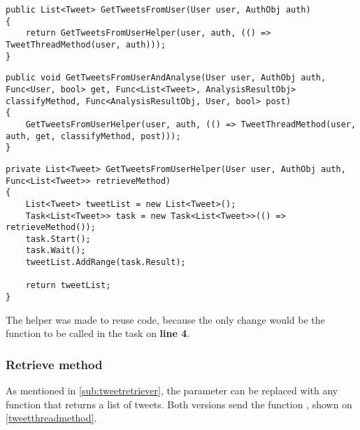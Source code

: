 \begin{minipage}[H]{\linewidth}
\begin{lstlisting}[caption = Legacy method call , label = legacyUserTweet ] 
public List<Tweet> GetTweetsFromUser(User user, AuthObj auth)
{	
    return GetTweetsFromUserHelper(user, auth, (() => TweetThreadMethod(user, auth)));
}
\end{lstlisting}
\end{minipage}

\begin{minipage}[H]{\linewidth}
\begin{lstlisting}[caption = Current method call to speed up execution , label =
NewUserTweet ] 
public void GetTweetsFromUserAndAnalyse(User user, AuthObj auth, Func<User, bool> get, Func<List<Tweet>, AnalysisResultObj> classifyMethod, Func<AnalysisResultObj, User, bool> post)
{
    GetTweetsFromUserHelper(user, auth, (() => TweetThreadMethod(user, auth, get, classifyMethod, post)));
}
\end{lstlisting}
\end{minipage}

\begin{minipage}[H]{\linewidth}
\begin{lstlisting}[caption = The GetTweetsFromUserHelper, label =
UserTweetHelper]
private List<Tweet> GetTweetsFromUserHelper(User user, AuthObj auth, Func<List<Tweet>> retrieveMethod)
{
    List<Tweet> tweetList = new List<Tweet>();
    Task<List<Tweet>> task = new Task<List<Tweet>>(() => retrieveMethod());
    task.Start();
    task.Wait();
    tweetList.AddRange(task.Result);

    return tweetList;
}
\end{lstlisting}
\end{minipage}

The helper was made to reuse code, because the only change would be the function to be
called in the task on \textbf{line 4}.\\

\subsubsection{Retrieve method}
As mentioned in \autoref{sub:tweetretriever}, the 
parameter can be replaced with any function that returns a list of tweets. Both
versions send the function , shown on
\autoref{tweetthreadmethod}. \\

